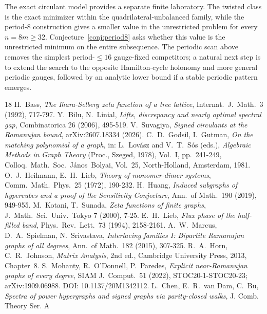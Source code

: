 \documentclass[11pt]{article}
\theoremstyle{remark}
\begin{document}
The exact circulant model provides a separate finite laboratory. The twisted class is the
exact minimizer within the quadrilateral-unbalanced family, while the period-$8$ construction
gives a smaller value in the unrestricted problem for every $n=8m\ge32$. Conjecture~\ref{conj:period8}
asks whether this value is the unrestricted minimum on the entire subsequence. The periodic
scan above removes the simplest period-$\le16$ gauge-fixed competitors; a natural next step
is to extend the search to the opposite Hamilton-cycle holonomy and more general periodic
gauges, followed by an analytic lower bound if a stable periodic pattern emerges.
\begingroup
\setlength{\emergencystretch}{2em}
\raggedright
\small\begin{thebibliography}{18}
 H.~Bass, \emph{The Ihara-Selberg zeta function of a
tree lattice}, Internat.~J.~Math.~3 (1992), 717-797.
 Y.~Bilu, N.~Linial,
\emph{Lifts, discrepancy and nearly optimal spectral gap},
Combinatorica 26 (2006), 495-519.
 V.~Suvagiya, \emph{Signed circulants at the Ramanujan
bound}, arXiv:2607.18334 (2026).
 C.~D.~Godsil, I.~Gutman,
\emph{On the matching polynomial of a graph}, in: L.~Lov\'asz and V.~T.~S\'os (eds.),
\emph{Algebraic Methods in Graph Theory} (Proc., Szeged, 1978), Vol.~I,
pp.~241-249, Colloq.~Math.~Soc.~J\'anos~Bolyai, Vol.~25, North-Holland, Amsterdam, 1981.
 O.~J.~Heilmann, E.~H.~Lieb,
\emph{Theory of monomer-dimer systems}, Comm.~Math.~Phys.~25 (1972),
190-232.
 H.~Huang, \emph{Induced subgraphs of hypercubes and a
proof of the Sensitivity Conjecture}, Ann.~of Math.~190 (2019), 949-955.
 M.~Kotani, T.~Sunada, \emph{Zeta functions of finite
graphs}, J.~Math.~Sci.~Univ.~Tokyo 7 (2000), 7-25.
 E.~H.~Lieb, \emph{Flux phase of the half-filled band},
Phys.~Rev.~Lett.~73 (1994), 2158-2161.
 A.~W.~Marcus, D.~A.~Spielman, N.~Srivastava,
\emph{Interlacing families I: Bipartite Ramanujan graphs of all degrees},
Ann.~of Math.~182 (2015), 307-325.
 R.~A.~Horn, C.~R.~Johnson, \emph{Matrix Analysis}, 2nd ed.,
Cambridge University Press, 2013, Chapter~8.
 S.~Mohanty, R.~O'Donnell, P.~Paredes,
\emph{Explicit near-Ramanujan graphs of every degree}, SIAM J.~Comput.~51
(2022), STOC20-1-STOC20-23; arXiv:1909.06988. DOI: 10.1137/20M1342112.
 L.~Chen, E.~R.~van Dam, C.~Bu, \emph{Spectra of power
hypergraphs and signed graphs via parity-closed walks}, J. Comb. Theory Ser. A

\end{thebibliography}
\end{document}
